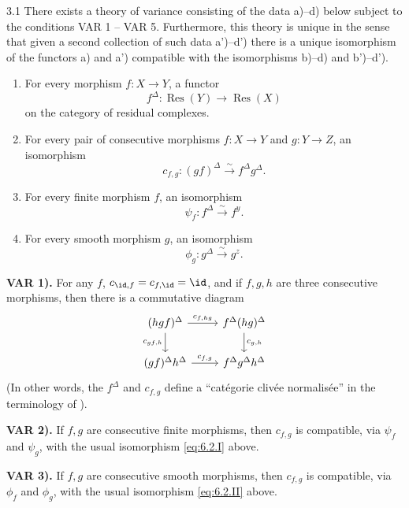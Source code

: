 \begin{booktheorem}{3.1}\label{thm:6.3.1}
There exists a theory of variance consisting of the data a)--d) below subject to the conditions VAR 1 -- VAR 5. Furthermore, this theory is unique in the sense that given a second collection of such data a')--d') there is a unique isomorphism of the functors a) and a') compatible with the isomorphisms b)--d) and b')--d').

\begin{enumerate}
\item[a)] For every morphism $f\colon X\to Y$, a functor
\[
f^{\Delta}\colon \operatorname{Res}(Y)\longrightarrow \operatorname{Res}(X)
\]
on the category of residual complexes.
\item[b)] For every pair of consecutive morphisms $f\colon X\to Y$ and $g\colon Y\to Z$, an isomorphism
\[
c_{f,g}\colon (gf)^{\Delta} \xrightarrow{\sim} f^{\Delta}g^{\Delta}.
\]
\item[c)] For every finite morphism $f$, an isomorphism
\[
\psi_f\colon f^{\Delta} \xrightarrow{\sim} f^{y}.
\]
\item[d)] For every smooth morphism $g$, an isomorphism
\[
\phi_g\colon g^{\Delta} \xrightarrow{\sim} g^{z}.
\]
\end{enumerate}

\medskip{}\label{var:6.3.1}\noindent\textbf{VAR 1).} For any $f$, $c_{\id,f}=c_{f,\id}=\id$, and if $f,g,h$ are three consecutive morphisms, then there is a commutative diagram
\[
\begin{tikzcd}
(hgf)^{\Delta} \ar[r,"c_{f,hg}"] \ar[d,"c_{gf,h}"'] & f^{\Delta}(hg)^{\Delta} \ar[d,"c_{g,h}"] \\
(gf)^{\Delta}h^{\Delta} \ar[r,"c_{f,g}"] & f^{\Delta}g^{\Delta}h^{\Delta}
\end{tikzcd}
\]
(In other words, the $f^{\Delta}$ and $c_{f,g}$ define a ``cat\'egorie cliv\'ee normalis\'ee'' in the terminology of \cite[--61, expos\'e~VI]{SGA}).

\medskip{}\label{var:6.3.2}\noindent\textbf{VAR 2).} If $f,g$ are consecutive finite morphisms, then $c_{f,g}$ is compatible, via $\psi_f$ and $\psi_g$, with the usual isomorphism \eqref{eq:6.2.I} above.

\medskip{}\label{var:6.3.3}\noindent\textbf{VAR 3).} If $f,g$ are consecutive smooth morphisms, then $c_{f,g}$ is compatible, via $\phi_f$ and $\phi_g$, with the usual isomorphism \eqref{eq:6.2.II} above.


\end{booktheorem}

